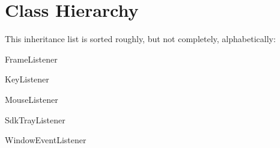 \section{Class Hierarchy}
This inheritance list is sorted roughly, but not completely, alphabetically\-:\begin{DoxyCompactList}
\item Frame\-Listener\begin{DoxyCompactList}
\item {}
\begin{DoxyCompactList}
\item {}
\end{DoxyCompactList}
\end{DoxyCompactList}
\item Key\-Listener\begin{DoxyCompactList}
\item {}
\end{DoxyCompactList}
\item Mouse\-Listener\begin{DoxyCompactList}
\item {}
\end{DoxyCompactList}
\item Sdk\-Tray\-Listener\begin{DoxyCompactList}
\item {}
\end{DoxyCompactList}
\item Window\-Event\-Listener\begin{DoxyCompactList}
\item {}
\end{DoxyCompactList}
\end{DoxyCompactList}
